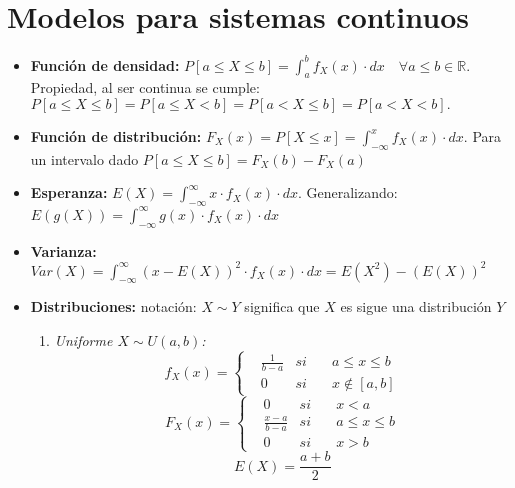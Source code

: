 \documentclass[a4paper, twocolumn, 10pt]{article}
\begin{document}
\section{Modelos para sistemas continuos}

\begin{itemize}
	\item \textbf{Función de densidad:} $\displaystyle P\left[a \leq X \leq b\right] = \int_{a}^{b}f_X(x)\cdot dx \quad \forall a\leq b \in \mathbb{R}$. Propiedad, al ser continua se cumple: $P\left[a \leq X \leq b\right] = P\left[a \leq X < b\right] = P\left[a < X \leq b\right] = P\left[a < X < b\right].$
	\item \textbf{Función de distribución:} $F_X(x) = P\left[X \leq x\right] = \displaystyle \int_{-\infty}^{x}f_X(x)\cdot dx$. Para un intervalo dado $P\left[a \leq X \leq b\right] = F_X(b) - F_X(a)$
	\item \textbf{Esperanza:} $E(X) = \displaystyle \int_{-\infty}^{\infty}x\cdot f_X(x)\cdot dx$. Generalizando: $E(g(X)) = \displaystyle \int_{-\infty}^{\infty}g(x)\cdot f_X(x)\cdot dx$
	\item \textbf{Varianza:} $Var(X) = \displaystyle \int_{-\infty}^{\infty}\left(x - E(X)\right)^2 \cdot f_X(x) \cdot dx = E(X^2) -(E(X))^2$
	\item \textbf{Distribuciones:} notación: $X\sim Y$ significa que $X$ es sigue una distribución $Y$
	\begin{enumerate}
		\item \textit{Uniforme $X\sim U(a,b)$:}
		\begin{equation*}
			f_X(x) = \left\lbrace
			\begin{aligned}
			&\frac{1}{b-a} & si \quad& a\leq x\leq b \\
			& 0 & si \quad & x \notin\left[a,b\right]
			\end{aligned} \right.
		\end{equation*}
		\begin{equation*}
			F_X(x) = \left\lbrace
			\begin{aligned}
			& 0 & si \quad & x < a \\
			&\frac{x-a}{b-a} & si \quad& a\leq x\leq b \\
			& 0 & si \quad & x >b
			\end{aligned} \right.
		\end{equation*}
		\begin{equation*}
			E(X) = \frac{a + b}{2}
		\end{equation*}
		\begin{equation*}

\end{equation*}
\end{enumerate}
\end{itemize}
\end{document}
